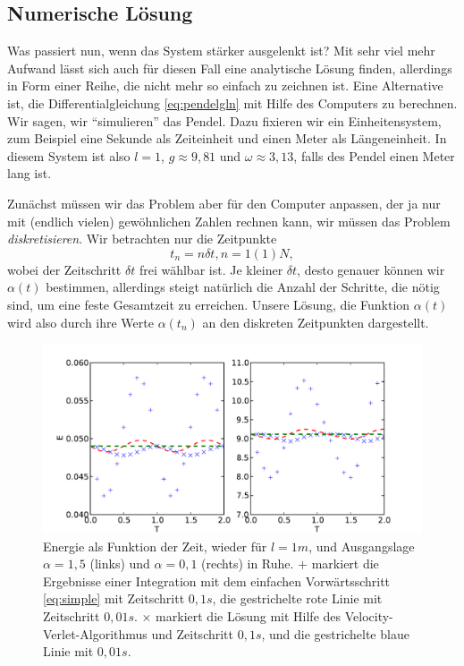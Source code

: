 \subsection{Numerische Lösung}

Was passiert nun, wenn das System stärker ausgelenkt ist? Mit sehr
viel mehr Aufwand lässt sich auch für diesen Fall eine analytische
Lösung finden, allerdings in Form einer Reihe, die nicht mehr so
einfach zu zeichnen ist. Eine Alternative ist, die
Differentialgleichung \eqref{eq:pendelgln} mit Hilfe des Computers zu
berechnen. Wir sagen, wir "`simulieren"' das Pendel. Dazu fixieren wir
ein Einheitensystem, zum Beispiel eine Sekunde als Zeiteinheit und
einen Meter als Längeneinheit. In diesem System ist also $l=1$,
$g\approx 9,81$ und $\omega\approx 3,13$, falls des Pendel einen Meter
lang ist.

Zunächst müssen wir das Problem aber für den Computer anpassen, der ja
nur mit (endlich vielen) gewöhnlichen Zahlen rechnen kann, wir müssen
das Problem \emph{diskretisieren}. Wir betrachten nur die Zeitpunkte
\begin{equation}
  t_n = n\delta t, n=1(1)N,
\end{equation}
wobei der Zeitschritt $\delta t$ frei wählbar ist. Je kleiner $\delta
t$, desto genauer können wir $\alpha(t)$ bestimmen, allerdings steigt
natürlich die Anzahl der Schritte, die nötig sind, um eine feste
Gesamtzeit zu erreichen. Unsere Lösung, die Funktion $\alpha(t)$ wird
also durch ihre Werte $\alpha(t_n)$ an den diskreten Zeitpunkten
dargestellt.

\begin{figure}
  \centering
  \includegraphics[width=\textwidth]{plots/pendel_energie}
  \caption{Energie als Funktion der Zeit, wieder für $l=1m$, und
    Ausgangslage $\alpha=1,5$ (links) und $\alpha=0,1$ (rechts) in
    Ruhe.  $+$ markiert die Ergebnisse einer Integration mit dem
    einfachen Vorwärtsschritt \eqref{eq:simple} mit Zeitschritt
    $0,1s$, die gestrichelte rote Linie mit Zeitschritt $0,01s$. $\times$
    markiert die Lösung mit Hilfe des Velocity-Verlet-Algorithmus und
    Zeitschritt $0,1s$, und die gestrichelte blaue Linie mit $0,01s$.}
  \label{fig:energie}
\end{figure}

